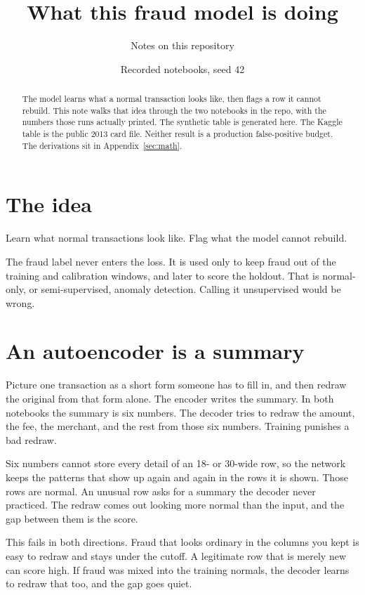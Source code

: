 \documentclass[11pt]{article}
\title{What this fraud model is doing}
\author{Notes on this repository}
\date{Recorded notebooks, seed 42}
\begin{document}
\maketitle

\begin{abstract}
The model learns what a normal transaction looks like, then flags a row
it cannot rebuild. This note walks that idea through the two notebooks
in the repo, with the numbers those runs actually printed.
The synthetic table is generated here. The Kaggle table is the public
2013 card file. Neither result is a production false-positive budget.
The derivations sit in Appendix~\ref{sec:math}.
\end{abstract}

\section{The idea}

Learn what normal transactions look like. Flag what the model cannot rebuild.

The fraud label never enters the loss. It is used only to keep fraud out
of the training and calibration windows, and later to score the holdout.
That is normal-only, or semi-supervised, anomaly detection. Calling it
unsupervised would be wrong.

\section{An autoencoder is a summary}

Picture one transaction as a short form someone has to fill in, and then
redraw the original from that form alone. The encoder writes the summary.
In both notebooks the summary is six numbers. The decoder tries to redraw
the amount, the fee, the merchant, and the rest from those six numbers.
Training punishes a bad redraw.

Six numbers cannot store every detail of an 18- or 30-wide row, so the
network keeps the patterns that show up again and again in the rows it is
shown. Those rows are normal. An unusual row asks for a summary the
decoder never practiced. The redraw comes out looking more normal than
the input, and the gap between them is the score.

This fails in both directions. Fraud that looks ordinary in the columns
you kept is easy to redraw and stays under the cutoff. A legitimate row
that is merely new can score high. If fraud was mixed into the training
normals, the decoder learns to redraw that too, and the gap goes quiet.
\end{document}
